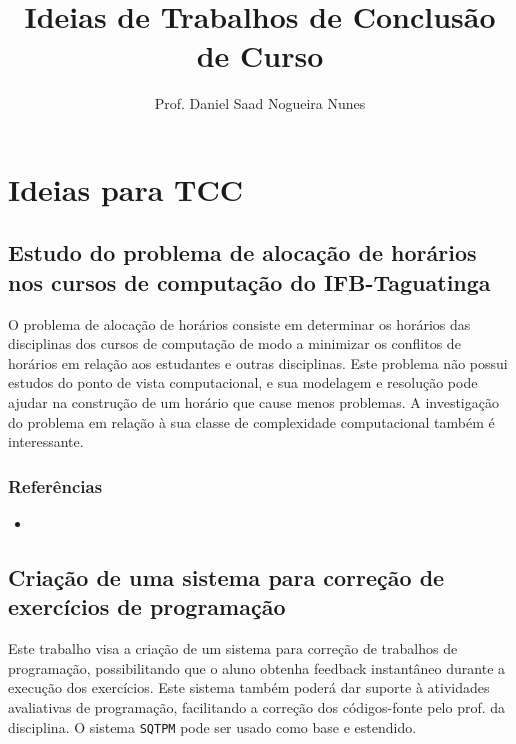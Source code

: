 \documentclass{article}
\author{Prof. Daniel Saad Nogueira Nunes}
\title{Ideias de Trabalhos de Conclusão de Curso}
\date{}
\newcommand*{\nsubsection}[1]{
    \subsection{#1}
}
\begin{document}
\maketitle
\setcounter{tocdepth}{2}
\setcounter{secnumdepth}{2}
\tableofcontents
{}	




\section{Ideias para TCC}


\nsubsection{Estudo do problema de alocação de horários nos cursos de computação do IFB-Taguatinga}

O problema de alocação de horários consiste em determinar os horários das disciplinas dos cursos de computação de modo a minimizar os conflitos de horários em relação aos estudantes e outras disciplinas. Este problema não possui estudos do ponto de vista computacional, e sua modelagem e resolução pode ajudar na construção de um horário que cause menos problemas. A investigação do problema em relação à sua classe de complexidade computacional também é interessante. 

\subsubsection*{Referências}


\begin{itemize}
	\item {}
\end{itemize}


\nsubsection{Criação de uma sistema para correção de exercícios de programação}

Este trabalho visa a criação de um sistema para correção de trabalhos de programação, possibilitando que o aluno obtenha feedback instantâneo durante a execução dos exercícios. Este sistema também poderá dar suporte à atividades avaliativas de programação, facilitando a correção dos códigos-fonte pelo prof. da disciplina. O sistema {\tt SQTPM} pode ser usado como base e estendido.
\end{document}
